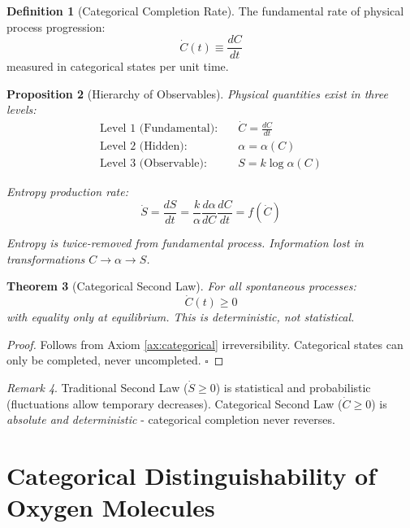 \documentclass[11pt,a4paper]{article}
\newtheorem{theorem}{Theorem}[section]
\newtheorem{proposition}[theorem]{Proposition}
\theoremstyle{definition}
\newtheorem{definition}[theorem]{Definition}
\theoremstyle{remark}
\newtheorem{remark}[theorem]{Remark}
\begin{document}
\begin{definition}[Categorical Completion Rate]
The fundamental rate of physical process progression:
\begin{equation}
\dot{C}(t) \equiv \frac{dC}{dt}
\label{eq:fundamental_rate}
\end{equation}
measured in categorical states per unit time.
\end{definition}

\begin{proposition}[Hierarchy of Observables]
Physical quantities exist in three levels:
\begin{align}
\text{Level 1 (Fundamental)}: \quad & \dot{C} = \frac{dC}{dt} \\
\text{Level 2 (Hidden)}: \quad & \alpha = \alpha(C) \\
\text{Level 3 (Observable)}: \quad & S = k \log \alpha(C)
\end{align}

Entropy production rate:
\begin{equation}
\dot{S} = \frac{dS}{dt} = \frac{k}{\alpha} \frac{d\alpha}{dC} \frac{dC}{dt} = f(\dot{C})
\end{equation}

Entropy is \textit{twice-removed} from fundamental process. Information lost in transformations $C \to \alpha \to S$.
\end{proposition}

\begin{theorem}[Categorical Second Law]
For all spontaneous processes:
\begin{equation}
\dot{C}(t) \geq 0
\end{equation}
with equality only at equilibrium. This is \textit{deterministic}, not statistical.
\end{theorem}

\begin{proof}
Follows from Axiom \ref{ax:categorical} irreversibility. Categorical states can only be completed, never uncompleted. $\square$
\end{proof}

\begin{remark}
Traditional Second Law ($\dot{S} \geq 0$) is statistical and probabilistic (fluctuations allow temporary decreases). Categorical Second Law ($\dot{C} \geq 0$) is \textit{absolute and deterministic} - categorical completion never reverses.
\end{remark}

\section{Categorical Distinguishability of Oxygen Molecules}
\end{document}
